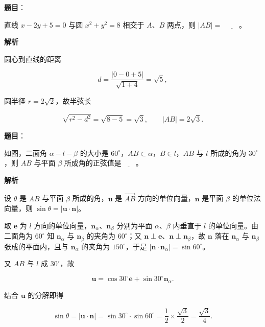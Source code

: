 \begin{answer}

\textbf{题目}：

直线 $x-2y+5=0$ 与圆 $x^2+y^2=8$ 相交于 $A$、$B$ 两点，则 $|AB|=$ $\underline{\qquad}$。

\textbf{解析}

圆心到直线的距离

\nopagebreak[4]
\[d=\frac{|0-0+5|}{\sqrt{1+4}}=\sqrt5,\]

圆半径 $r=2\sqrt2$，故半弦长

\nopagebreak[4]
\[\sqrt{r^2-d^2}=\sqrt{8-5}=\sqrt3,\qquad |AB|=2\sqrt3.\]


\end{answer}
\begin{answer}

\textbf{题目}：

如图，二面角 $\alpha-l-\beta$ 的大小是 $60^\circ$，$AB\subset\alpha$，$B\in l$，$AB$ 与 $l$ 所成的角为 $30^\circ$，则 $AB$ 与平面 $\beta$ 所成角的正弦值是$\underline{\qquad}$。
\nopagebreak[4]
\begin{center}\end{center}
\nopagebreak[4]
\textbf{解析}

设 $\theta$ 是 $AB$ 与平面 $\beta$ 所成的角，$\boldsymbol u$ 是 $\overrightarrow{AB}$ 方向的单位向量，$\boldsymbol n$ 是平面 $\beta$ 的单位法向量，则 $\sin\theta=\left|\boldsymbol u\cdot\boldsymbol n\right|$。

取 $\boldsymbol e$ 为 $l$ 方向的单位向量，$\boldsymbol n_\alpha$、$\boldsymbol n_\beta$ 分别为平面 $\alpha$、$\beta$ 内垂直于 $l$ 的单位向量。由二面角为 $60^\circ$ 知 $\boldsymbol n_\alpha$ 与 $\boldsymbol n_\beta$ 的夹角为 $60^\circ$；又 $\boldsymbol n\perp\boldsymbol e$、$\boldsymbol n\perp\boldsymbol n_\beta$，故 $\boldsymbol n$ 落在 $\boldsymbol n_\alpha$ 与 $\boldsymbol n_\beta$ 张成的平面内，且与 $\boldsymbol n_\alpha$ 的夹角为 $150^\circ$，于是 $\left|\boldsymbol n\cdot\boldsymbol n_\alpha\right|=\sin60^\circ$。

又 $AB$ 与 $l$ 成 $30^\circ$，故

\nopagebreak[4]
\[\boldsymbol u=\cos30^\circ\boldsymbol e+\sin30^\circ\boldsymbol n_\alpha.\]

结合 $\boldsymbol u$ 的分解即得

\nopagebreak[4]
\[\sin\theta=\left|\boldsymbol u\cdot\boldsymbol n\right|=\sin30^\circ\cdot\sin60^\circ=\frac12\times\frac{\sqrt3}2=\frac{\sqrt3}4.\]


\end{answer}
